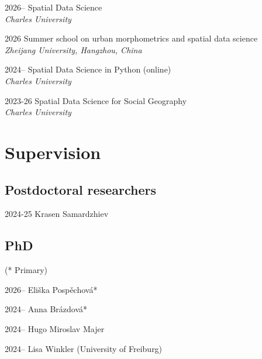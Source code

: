 \documentclass[12pt,a4paper]{report}
\begin{document}
    \begin{tablist}

        \item[2026--] \tab{}Spatial Data Science \\
                    \textit{Charles University}
        \item[2026] \tab{}Summer school on urban morphometrics and spatial data science \\
                    \textit{Zheijang University, Hangzhou, China}
        \item[2024--] \tab{}Spatial Data Science in Python (online) \\
                            \textit{Charles University}
        \item[2023-26] \tab{}Spatial Data Science for Social Geography \\
                            \textit{Charles University}

    \end{tablist}

    \section*{Supervision}

    \subsection*{Postdoctoral researchers}

    \begin{tablist}

        \item[2024-25] \tab{}Krasen Samardzhiev

    \end{tablist}

    \subsection*{PhD}
    (* Primary)

    \begin{tablist}

        \item[2026--] \tab{}Eliška Pospěchová*
        \item[2024--] \tab{}Anna Brázdová*
        \item[2024--] \tab{}Hugo Miroslav Majer
        \item[2024--] \tab{}Lisa Winkler (University of Freiburg)

    \end{tablist}
\end{document}
